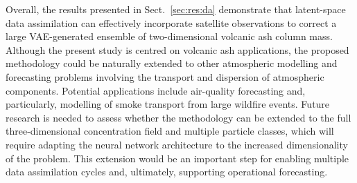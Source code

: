 Overall, the results presented in Sect.~\ref{sec:res:da} demonstrate that latent-space data assimilation can effectively incorporate satellite observations to correct a large VAE-generated ensemble of two-dimensional volcanic ash column mass. Although the present study is centred on volcanic ash applications, the proposed methodology could be naturally extended to other atmospheric modelling and forecasting problems involving the transport and dispersion of atmospheric components. Potential applications include air-quality forecasting and, particularly, modelling of smoke transport from large wildfire events. Future research is needed to assess whether the methodology can be extended to the full three-dimensional concentration field and multiple particle classes, which will require adapting the neural network architecture to the increased dimensionality of the problem. This extension would be an important step for enabling multiple data assimilation cycles and, ultimately, supporting operational forecasting.